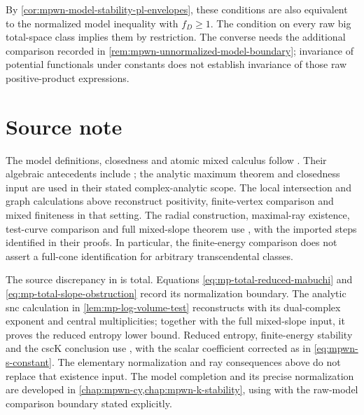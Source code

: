 By \cref{cor:mpwn-model-stability-pl-envelopes}, these conditions are also equivalent to the normalized model inequality with $f_D\geq1$. The condition on every raw big total-space class implies them by restriction. The converse needs the additional comparison recorded in \cref{rem:mpwn-unnormalized-model-boundary}; invariance of potential functionals under constants does not establish invariance of those raw positive-product expressions.

\section*{Source note}
\label{sec:mp-psh-source-note}

The model definitions, closedness and atomic mixed calculus follow \cite[Sections~4.1--4.4]{MPTropicalV2}. Their algebraic antecedents include \cite[Proposition~3.6 and Lemma~3.24]{BJ22}; the analytic maximum theorem and closedness input are used in their stated complex-analytic scope. The local intersection and graph calculations above reconstruct positivity, finite-vertex comparison and mixed finiteness in that setting. The radial construction, maximal-ray existence, test-curve comparison and full mixed-slope theorem use \cite[Sections~5.1--5.3]{MPTropicalV2}, with the imported steps identified in their proofs. In particular, the finite-energy comparison does not assert a full-cone identification for arbitrary transcendental classes.

The source discrepancy in \cite[(3.2.4)]{MPTropicalV2} is total. Equations \eqref{eq:mp-total-reduced-mabuchi} and \eqref{eq:mp-total-slope-obstruction} record its normalization boundary. The analytic snc calculation in \cref{lem:mp-log-volume-test} reconstructs \cite[Lemma~3.11, p.~2924]{BHJ19} with its dual-complex exponent and central multiplicities; together with the full mixed-slope input, it proves the reduced entropy lower bound. Reduced entropy, finite-energy stability and the cscK conclusion use \cite[Definitions~2.4.1--2.4.2 and Theorem~2.4.3, p.~13]{MPWN25}, with the scalar coefficient corrected as in \eqref{eq:mpwn-s-constant}. The elementary normalization and ray consequences above do not replace that existence input. The model completion and its precise normalization are developed in \cref{chap:mpwn-cy,chap:mpwn-k-stability}, using \cite[Theorem~9.2.1 and Corollary~9.2.2, pp.~34--35]{MPWN25} with the raw-model comparison boundary stated explicitly.
